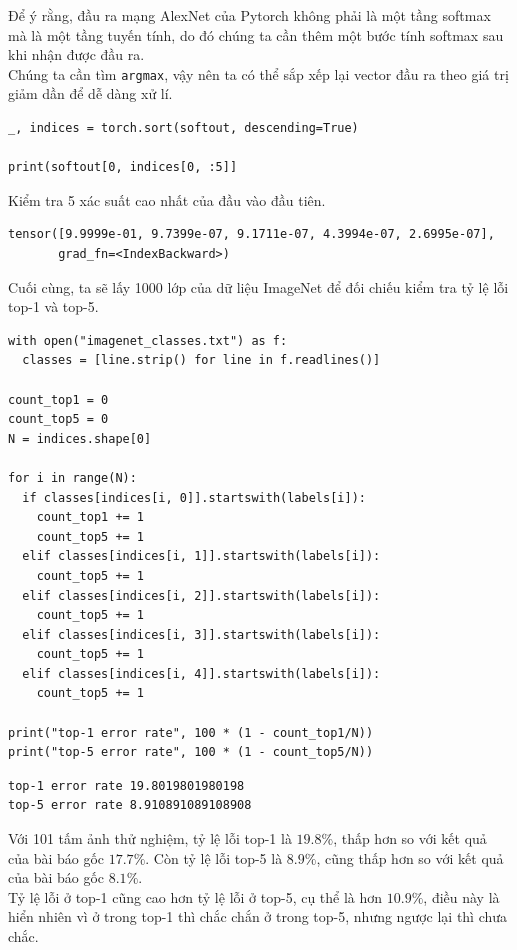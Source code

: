 \documentclass[a4paper]{article}
\begin{document}
\noindent
Để ý rằng, đầu ra mạng AlexNet của Pytorch không phải là một tầng softmax mà là một tầng tuyến tính, do đó chúng ta cần thêm một bước tính softmax sau khi nhận được đầu ra.\\
Chúng ta cần tìm \texttt{argmax}, vậy nên ta có thể sắp xếp lại vector đầu ra theo giá trị giảm dần để dễ dàng xử lí.
\begin{lstlisting}
_, indices = torch.sort(softout, descending=True)

print(softout[0, indices[0, :5]]
\end{lstlisting}
Kiểm tra 5 xác suất cao nhất của đầu vào đầu tiên.
\begin{verbatim}
tensor([9.9999e-01, 9.7399e-07, 9.1711e-07, 4.3994e-07, 2.6995e-07],
       grad_fn=<IndexBackward>)
\end{verbatim}
Cuối cùng, ta sẽ lấy 1000 lớp của dữ liệu ImageNet để đối chiếu kiểm tra tỷ lệ lỗi top-1 và top-5.
\begin{lstlisting}
with open("imagenet_classes.txt") as f:
  classes = [line.strip() for line in f.readlines()]
  
count_top1 = 0
count_top5 = 0
N = indices.shape[0]

for i in range(N):
  if classes[indices[i, 0]].startswith(labels[i]):
    count_top1 += 1
    count_top5 += 1
  elif classes[indices[i, 1]].startswith(labels[i]):
    count_top5 += 1
  elif classes[indices[i, 2]].startswith(labels[i]):
    count_top5 += 1
  elif classes[indices[i, 3]].startswith(labels[i]):
    count_top5 += 1
  elif classes[indices[i, 4]].startswith(labels[i]):
    count_top5 += 1

print("top-1 error rate", 100 * (1 - count_top1/N))
print("top-5 error rate", 100 * (1 - count_top5/N))
\end{lstlisting}
\begin{verbatim}
top-1 error rate 19.8019801980198
top-5 error rate 8.910891089108908
\end{verbatim}
Với 101 tấm ảnh thử nghiệm, tỷ lệ lỗi top-1 là $19.8\%$, thấp hơn so với kết quả của bài báo gốc $17.7\%$. Còn tỷ lệ lỗi top-5 là $8.9\%$, cũng thấp hơn so với kết quả của bài báo gốc $8.1\%$.\\
Tỷ lệ lỗi ở top-1 cũng cao hơn tỷ lệ lỗi ở top-5, cụ thể là hơn $10.9\%$, điều này là hiển nhiên vì ở trong top-1 thì chắc chắn ở trong top-5, nhưng ngược lại thì chưa chắc.

\clearpage
\end{document}
